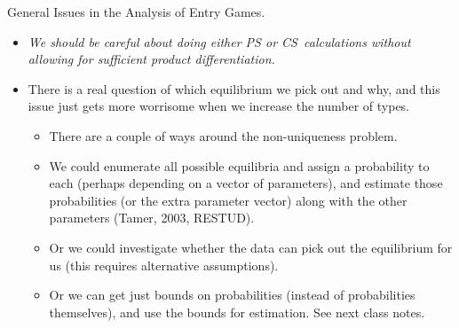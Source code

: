 \begin{frame}{General Issues in the Analysis of Entry Games.}
\footnotesize

\begin{itemize}
\item \textit{We should be careful about doing either PS or CS\ calculations
without allowing for sufficient product differentiation. }
\item There is a real question of which equilibrium we pick out and why, and
this issue just gets more worrisome when we increase the number of types.
\begin{itemize}
\item There are a couple of ways around the non-uniqueness problem.
\item We could enumerate all possible equilibria and assign a probability to
each (perhaps depending on a vector of parameters), and estimate those
probabilities (or the extra parameter vector) along with the other
parameters (Tamer, 2003, RESTUD).
\item Or we could investigate whether the data can pick out the equilibrium
for us (this requires alternative assumptions).
\item Or we can get just bounds on probabilities (instead of probabilities
themselves), and use the bounds for estimation. See next class notes.
\end{itemize}
\end{itemize}
\end{frame}

